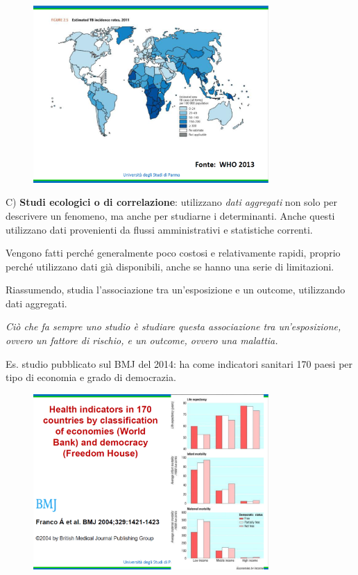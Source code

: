 \begin{figure}[!ht]
\centering
	\includegraphics[width=0.8\textwidth]{04/image4.png}
	\end{figure}

C) \textbf{Studi ecologici o di correlazione}: utilizzano \emph{dati
aggregati} non solo per descrivere un fenomeno, ma anche per studiarne i
determinanti. Anche questi utilizzano dati provenienti da flussi
amministrativi e statistiche correnti.

Vengono fatti perché generalmente poco costosi e relativamente rapidi,
proprio perché utilizzano dati già disponibili, anche se hanno una serie
di limitazioni.

Riassumendo, studia l'associazione tra un'esposizione e un outcome,
utilizzando dati aggregati.

\emph{Ciò che fa sempre uno studio è studiare questa associazione tra
un'esposizione, ovvero un fattore di rischio, e un outcome, ovvero una
malattia.}

Es. studio pubblicato sul BMJ del 2014: ha come indicatori sanitari 170
paesi per tipo di economia e grado di democrazia.

\begin{figure}[!ht]
\centering
	\includegraphics[width=0.8\textwidth]{04/image5.png}
	\end{figure}

